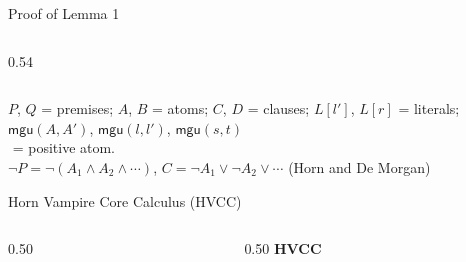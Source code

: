 \documentclass[aspectratio=43]{beamer}
\begin{document}
\begin{frame}{Proof of Lemma 1}
\begin{columns}[T]
\begin{column}{0.54\textwidth}
\begin{mathpar}
        \end{mathpar}
      \end{column}
    \end{columns}
    \vfill
    {\footnotesize $P$, $Q$ = premises;\; $A$, $B$ = atoms;\; $C$, $D$ = clauses;\; $L[l']$, $L[r]$ = literals;\; \\
     $\mathsf{mgu}(A,A')$, $\mathsf{mgu}(l,l')$, $\mathsf{mgu}(s,t)$ \\ }
    {\footnotesize $\boxed{}$ = positive atom. \\}
    {\footnotesize $\neg P = \neg(A_1 \land A_2 \land \cdots)$, $C = \neg A_1 \lor \neg A_2 \lor \cdots$ (Horn and De Morgan) \\}
\end{frame}

\begin{frame}{Horn Vampire Core Calculus (HVCC)}
    \tiny
    \begin{columns}[T]
      \begin{column}{0.50\textwidth}
        \centering\scriptsize
        \begin{mathpar}
        \end{mathpar}
        \begin{mathpar}
        \end{mathpar}
        \begin{mathpar}
        \end{mathpar}
        \begin{mathpar}
        \end{mathpar}
        \begin{mathpar}
        \end{mathpar}
      \end{column}
      \begin{column}{0.50\textwidth}
        \centering\scriptsize\textbf{HVCC}
        \begin{mathpar}

\end{mathpar}
\end{column}
\end{columns}
\end{frame}
\end{document}
